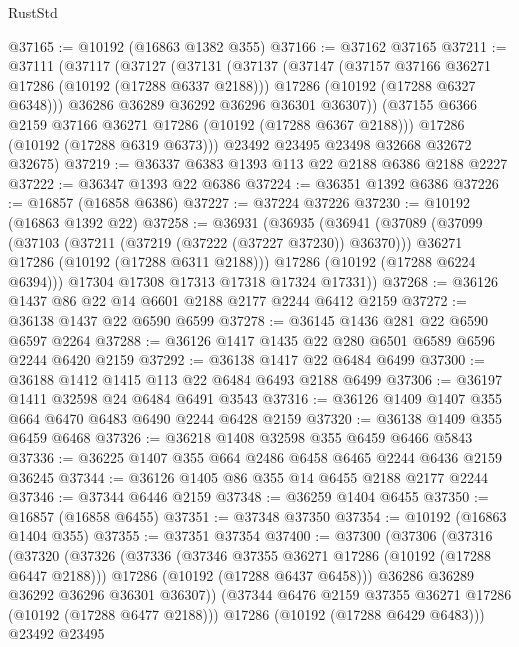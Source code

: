 \begin{lexlean}{RustStd}
\begin{coremodule}
@37165 := @10192 (@16863 @1382 @355)
@37166 := @37162 @37165
@37211 := @37111
    (@37117
      (@37127
        (@37131
          (@37137
            (@37147
              (@37157 @37166 @36271 @17286 (@10192 (@17288 @6337 @2188)))
              @17286
              (@10192 (@17288 @6327 @6348)))
            @36286
            @36289
            @36292
            @36296
            @36301
            @36307))
        (@37155 @6366 @2159 @37166 @36271 @17286 (@10192 (@17288 @6367 @2188)))
        @17286
        (@10192 (@17288 @6319 @6373)))
      @23492
      @23495
      @23498
      @32668
      @32672
      @32675)
@37219 := @36337 @6383 @1393 @113 @22 @2188 @6386 @2188 @2227
@37222 := @36347 @1393 @22 @6386
@37224 := @36351 @1392 @6386
@37226 := @16857 (@16858 @6386)
@37227 := @37224 @37226
@37230 := @10192 (@16863 @1392 @22)
@37258 := @36931
    (@36935
      (@36941
        (@37089
          (@37099
            (@37103 (@37211 (@37219 (@37222 (@37227 @37230)) @36370)))
            @36271
            @17286
            (@10192 (@17288 @6311 @2188)))
          @17286
          (@10192 (@17288 @6224 @6394)))
        @17304
        @17308
        @17313
        @17318
        @17324
        @17331))
@37268 := @36126 @1437 @86 @22 @14 @6601 @2188 @2177 @2244 @6412 @2159
@37272 := @36138 @1437 @22 @6590 @6599
@37278 := @36145 @1436 @281 @22 @6590 @6597 @2264
@37288 := @36126 @1417 @1435 @22 @280 @6501 @6589 @6596 @2244 @6420 @2159
@37292 := @36138 @1417 @22 @6484 @6499
@37300 := @36188 @1412 @1415 @113 @22 @6484 @6493 @2188 @6499
@37306 := @36197 @1411 @32598 @24 @6484 @6491 @3543
@37316 := @36126 @1409 @1407 @355 @664 @6470 @6483 @6490 @2244 @6428 @2159
@37320 := @36138 @1409 @355 @6459 @6468
@37326 := @36218 @1408 @32598 @355 @6459 @6466 @5843
@37336 := @36225 @1407 @355 @664 @2486 @6458 @6465 @2244 @6436 @2159 @36245
@37344 := @36126 @1405 @86 @355 @14 @6455 @2188 @2177 @2244
@37346 := @37344 @6446 @2159
@37348 := @36259 @1404 @6455
@37350 := @16857 (@16858 @6455)
@37351 := @37348 @37350
@37354 := @10192 (@16863 @1404 @355)
@37355 := @37351 @37354
@37400 := @37300
    (@37306
      (@37316
        (@37320
          (@37326
            (@37336
              (@37346 @37355 @36271 @17286 (@10192 (@17288 @6447 @2188)))
              @17286
              (@10192 (@17288 @6437 @6458)))
            @36286
            @36289
            @36292
            @36296
            @36301
            @36307))
        (@37344 @6476 @2159 @37355 @36271 @17286 (@10192 (@17288 @6477 @2188)))
        @17286
        (@10192 (@17288 @6429 @6483)))
      @23492
      @23495

\end{coremodule}
\end{lexlean}
